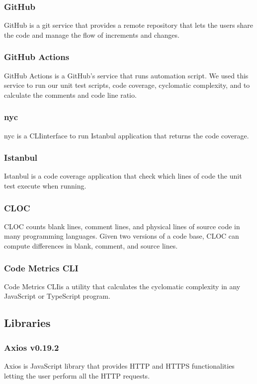 \subsubsection*{GitHub}
GitHub is a git service that provides a remote repository that lets the users share the code and manage the flow of increments and changes.

\subsubsection*{GitHub Actions}
GitHub Actions is a GitHub's service that runs automation script.
We used this service to run our unit test scripts, code coverage, cyclomatic complexity, and to calculate the comments and code line ratio.

\subsubsection*{nyc}
nyc is a CLI\glo interface to run Istanbul application that returns the code coverage.

\subsubsection*{Istanbul}
Istanbul is a code coverage application that check which lines of code the unit test execute when running.

\subsubsection*{CLOC}
CLOC counts blank lines, comment lines, and physical lines of source code in many programming languages. Given two versions of a code base, CLOC can compute differences in blank, comment, and source lines.

\subsubsection*{Code Metrics CLI}
Code Metrics CLI\glo is a utility that calculates the cyclomatic complexity in any JavaScript or TypeScript program.


\subsection{Libraries}

\subsubsection*{Axios v0.19.2}
Axios is JavaScript library that provides HTTP and HTTPS functionalities letting the user perform all the HTTP requests.

